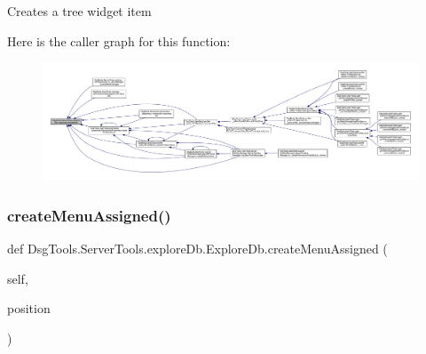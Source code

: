 \begin{DoxyVerb}Creates a tree widget item
\end{DoxyVerb}
 Here is the caller graph for this function\+:
\nopagebreak
\begin{figure}[H]
\begin{center}
\leavevmode
\includegraphics[width=350pt]{class_dsg_tools_1_1_server_tools_1_1explore_db_1_1_explore_db_a526574416eadb2311ed5ce6fccced60e_icgraph}
\end{center}
\end{figure}
\mbox{\label{class_dsg_tools_1_1_server_tools_1_1explore_db_1_1_explore_db_a8f2a2a5c58fcd3212e350caf0b089775}} 
\subsubsection{\texorpdfstring{create\+Menu\+Assigned()}{createMenuAssigned()}}
{\footnotesize\ttfamily def Dsg\+Tools.\+Server\+Tools.\+explore\+Db.\+Explore\+Db.\+create\+Menu\+Assigned (\begin{DoxyParamCaption}\item[{}]{self,  }\item[{}]{position }\end{DoxyParamCaption})}

